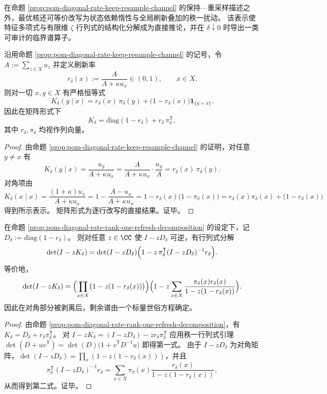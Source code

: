
在命题 \ref{prop:pom-diagonal-rate-keep-resample-channel} 的保持—重采样描述之外，最优核还可等价改写为状态依赖惰性与全局刷新叠加的秩一扰动。
该表示使特征多项式与有限维 \(\zeta\) 行列式的结构化分解成为直接推论，并在 \(\delta\downarrow 0\) 时导出一类可审计的临界谱算子。

\begin{proposition}[秩一刷新核表示]\label{prop:pom-diagonal-rate-rank-one-refresh-decomposition}
沿用命题 \ref{prop:pom-diagonal-rate-keep-resample-channel} 的记号，令
\(
A:=\sum_{z\in X}u_z
\)
并定义刷新率
\[
r_\delta(x):=\frac{A}{A+\kappa u_x}\in(0,1),\qquad x\in X.
\]
则对一切 \(x,y\in X\) 有严格恒等式
\[
K_\delta(y\mid x)
=r_\delta(x)\,\pi_\delta(y)+\bigl(1-r_\delta(x)\bigr)\mathbf 1_{\{y=x\}}.
\]
因此在矩阵形式下
\[
K_\delta=\mathrm{diag}(1-r_\delta)+r_\delta\,\pi_\delta^{\mathsf T},
\]
其中 \(r_\delta,\pi_\delta\) 均视作列向量。
\end{proposition}
\begin{proof}
由命题 \ref{prop:pom-diagonal-rate-keep-resample-channel} 的证明，对任意 \(y\ne x\) 有
\[
K_\delta(y\mid x)=\frac{u_y}{A+\kappa u_x}
=\frac{A}{A+\kappa u_x}\cdot \frac{u_y}{A}
=r_\delta(x)\,\pi_\delta(y).
\]
对角项由
\[
K_\delta(x\mid x)=\frac{(1+\kappa)u_x}{A+\kappa u_x}
=1-\frac{A-u_x}{A+\kappa u_x}
=1-r_\delta(x)\bigl(1-\pi_\delta(x)\bigr)
=r_\delta(x)\pi_\delta(x)+\bigl(1-r_\delta(x)\bigr)
\]
得到所示表示。
矩阵形式为逐行改写的直接结果。证毕。
\end{proof}

\begin{theorem}\label{thm:pom-diagonal-rate-rank-one-refresh-determinant-collapse}
在命题 \ref{prop:pom-diagonal-rate-rank-one-refresh-decomposition} 的设定下，记
\(
D_\delta:=\mathrm{diag}(1-r_\delta)
\)。
则对任意 \(z\in\CC\) 使 \(I-zD_\delta\) 可逆，有行列式分解
\[
\det(I-zK_\delta)=\det(I-zD_\delta)\Bigl(1-z\,\pi_\delta^{\mathsf T}(I-zD_\delta)^{-1}r_\delta\Bigr).
\]
等价地，
\[
\det(I-zK_\delta)
=\Bigl(\prod_{x\in X}\bigl(1-z(1-r_\delta(x))\bigr)\Bigr)
\Bigl(1-z\sum_{x\in X}\frac{\pi_\delta(x)r_\delta(x)}{1-z(1-r_\delta(x))}\Bigr).
\]
因此在对角部分被剥离后，剩余谱由一个标量世俗方程确定。
\end{theorem}
\begin{proof}
由命题 \ref{prop:pom-diagonal-rate-rank-one-refresh-decomposition}，有 \(K_\delta=D_\delta+r_\delta\pi_\delta^{\mathsf T}\)。
对
\(
I-zK_\delta=(I-zD_\delta)-z r_\delta\pi_\delta^{\mathsf T}
\)
应用秩一行列式引理
\(
\det(D+uv^{\mathsf T})=\det(D)\bigl(1+v^{\mathsf T}D^{-1}u\bigr)
\)
即得第一式。
由于 \(I-zD_\delta\) 为对角矩阵，\(\det(I-zD_\delta)=\prod_x(1-z(1-r_\delta(x)))\)，并且
\[
\pi_\delta^{\mathsf T}(I-zD_\delta)^{-1}r_\delta
=\sum_{x\in X}\pi_\delta(x)\frac{r_\delta(x)}{1-z(1-r_\delta(x))},
\]
从而得到第二式。证毕。
\end{proof}

